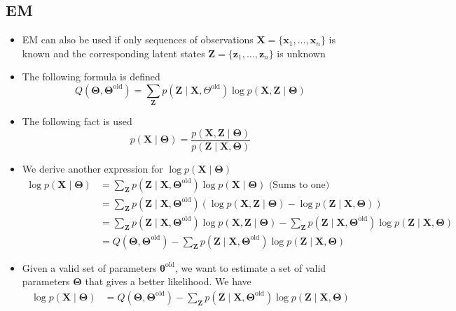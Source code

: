 \documentclass[a4, english]{article}
\begin{document}
\subsection{EM}
\begin{itemize}
	\item EM can also be used if only sequences of observations $\pmb X = \{\pmb x_1, \dots, \pmb x_n\}$ is known and the corresponding latent states $\pmb Z = \{\pmb z_1, \dots, \pmb z_n\}$ is unknown  
  \item The following formula is defined
  \begin{equation*}
    Q(\pmb \Theta, \pmb \Theta^\text{old}) = \sum_{\pmb Z} p(\pmb Z \mid \pmb X, \Theta^\text{old}) \log p(\pmb X, \pmb Z \mid \pmb \Theta)
  \end{equation*}
  \item The following fact is used 
  \begin{equation*}
    p(\pmb X \mid \pmb \Theta) = \frac{p(\pmb X, \pmb Z \mid \pmb \Theta)}{p(\pmb Z \mid \pmb X, \pmb \Theta)}
  \end{equation*}
  \item We derive another expression for $\log p(\pmb X \mid \pmb \Theta)$ 
  \begin{align*}
     \log p(\pmb X \mid \pmb \Theta) &= \sum_{\pmb Z} p(\pmb Z \mid \pmb X, \pmb \Theta^\text{old}) \log p(\pmb X \mid \pmb \Theta) \text{  (Sums to one)} \\
                                     &= \sum_{\pmb Z} p(\pmb Z \mid \pmb X, \pmb \Theta^\text{old})( \log p(\pmb X , \pmb Z \mid \pmb \Theta) - \log p(\pmb Z \mid \pmb X, \pmb \Theta)) \\
                                     &= \sum_{\pmb Z} p(\pmb Z \mid \pmb X, \pmb \Theta^\text{old}) \log p(\pmb X , \pmb Z \mid \pmb \Theta) - \sum_{\pmb Z} p(\pmb Z \mid \pmb X, \pmb \Theta^\text{old}) \log p(\pmb Z \mid \pmb X, \pmb \Theta) \\
                                     &= Q(\pmb \Theta, \pmb \Theta^\text{old})- \sum_{\pmb Z} p(\pmb Z \mid \pmb X, \pmb \Theta^\text{old}) \log p(\pmb Z \mid \pmb X, \pmb \Theta) 
  \end{align*}
  \item Given a valid set of parameters $\pmb \theta^\text{old}$, we want to estimate a set of valid parameters $\pmb \Theta$ that gives a better likelihood. We have
  \begin{align*}
    \log p(\pmb X \mid \pmb \Theta) &= Q(\pmb \Theta, \pmb \Theta^\text{old})- \sum_{\pmb Z} p(\pmb Z \mid \pmb X, \pmb \Theta^\text{old}) \log p(\pmb Z \mid \pmb X, \pmb \Theta) \\

\end{align*}
\end{itemize}
\end{document}
